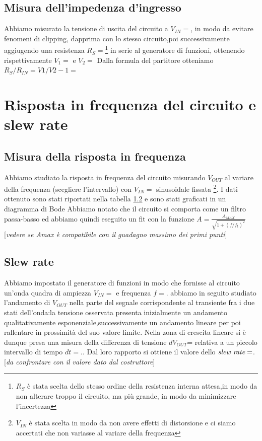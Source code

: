 \documentclass[10pt,a4paper]{article}
\newcommand{\rem}[1]{[\emph{#1}]}
\begin{document}
\subsection{Misura dell'impedenza d'ingresso}
Abbiamo misurato la tensione di uscita del circuito a $V_{IN}=$, in modo da evitare fenomeni di clipping, dapprima con lo stesso circuito,poi successivamente aggiugendo una resistenza $R_S=$\footnote{$R_S$ è stata scelta dello stesso ordine della resistenza interna attesa,in modo da non alterare troppo il circuito, ma più grande, in modo da minimizzare l'incertezza} in serie al generatore di funzioni, ottenendo rispettivamente $V_1=$ e $V_2=$ Dalla formula del partitore otteniamo $R_S/R_{IN}=V1/V2-1=$
\section{Risposta in frequenza del circuito e slew rate}
\subsection{Misura della risposta in frequenza}
Abbiamo studiato la risposta in frequenza del circuito misurando $V_{OUT}$ al variare della frequenza (scegliere l'intervallo) con $V_{IN}=$  sinusoidale fissata \footnote{$V_{IN}$ è stata scelta in modo da non avere effetti di distorsione e ci siamo accertati che non variasse al variare della frequenza}.
I dati ottenuto sono stati riportati nella tabella \ref{} e sono stati graficati in un diagramma di Bode
Abbiamo notato che il circuito si comporta come un filtro passa-basso ed abbiamo quindi  eseguito un fit con la funzione $ A=\frac{A_{MAX}}{\sqrt{1+(f/f_t)^2}}$
\rem{vedere se Amax è compatibile con il guadagno massimo dei primi punti}


\subsection{Slew rate}
Abbiamo impostato il generatore di funzioni in modo che fornisse al circuito un’onda quadra di ampiezza $V_{IN} =$ e frequenza $f=$. abbiamo in seguito studiato l'andamento di $V_{OUT}$ nella parte del segnale corrispondente al transiente fra i due stati dell’onda:la tensione osservata presenta inizialmente un andamento qualitativamente esponenziale,successivamente un andamento lineare per poi rallentare in prossimità del suo valore limite. Nella zona di crescita lineare si è dunque presa una misura della differenza di tensione $dV_{OUT}$= relativa a un piccolo intervallo di tempo $dt=$.. Dal loro rapporto si ottiene il valore dello $\emph{slew rate}=$.
\rem{da confrontare con il valore dato dal costruttore}
\end{document}

